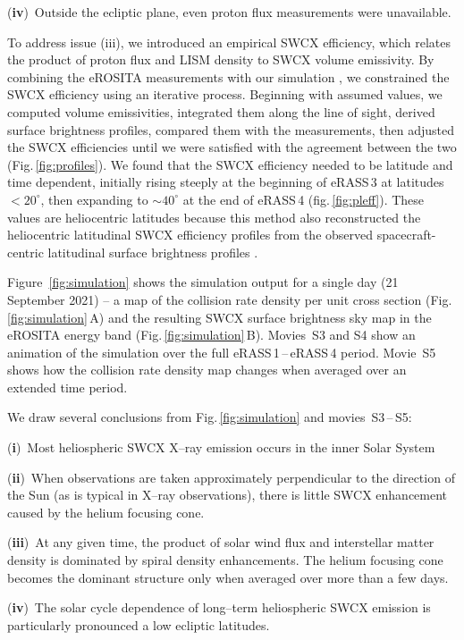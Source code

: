 \documentclass[12pt]{article}
\renewcommand{\deg}{^{\circ}}
\newcommand{\erass}{eRASS\,}
\begin{document}
({\bf iv})~Outside the ecliptic plane, even proton flux measurements were unavailable.

To address issue (iii), we introduced an empirical SWCX efficiency, which relates the product of proton flux and LISM density to SWCX volume emissivity. By combining the eROSITA measurements with our simulation \cite{methods}, we constrained the SWCX efficiency using an iterative process. Beginning with assumed values, we computed volume emissivities, integrated them along the line of sight, derived surface brightness profiles, compared them with the measurements, then adjusted the SWCX efficiencies until we were satisfied with the agreement between the two  (Fig.\,\ref{fig:profiles}). We found that the SWCX efficiency needed to be latitude and time dependent, initially rising steeply at the beginning of \erass3 at latitudes $<20\deg$, then expanding to $\sim40\deg$ at the end of \erass4 (fig.\,\ref{fig:pleff}). These values are heliocentric latitudes because this method also reconstructed  the heliocentric latitudinal SWCX efficiency profiles from the observed spacecraft-centric latitudinal surface brightness profiles \cite{methods}.

Figure~\ref{fig:simulation} shows the simulation output for a single day (21 September 2021) -- a map of the collision rate density per unit cross section (Fig.\,\ref{fig:simulation}\,A) and the resulting SWCX surface brightness sky map in the eROSITA energy band (Fig.\,\ref{fig:simulation}\,B).  Movies~S3 and S4 show an animation of the simulation over the full \erass1\,--\,\erass4 period. Movie~S5 shows how the collision rate density map changes when averaged over an extended time period.

We draw several conclusions from Fig.\,\ref{fig:simulation} and movies~S3\,--\,S5:

({\bf i})~Most heliospheric SWCX X--ray emission occurs in the inner Solar System \cite{note1}

({\bf ii})~When observations are taken approximately perpendicular to the direction of the Sun (as is typical in X--ray observations), there is little SWCX enhancement caused by the helium focusing cone.

({\bf iii})~At any given time, the product of solar wind flux and interstellar matter density is dominated by spiral density enhancements. The helium focusing cone becomes the dominant structure only when averaged over more than a few days.

({\bf iv})~The solar cycle dependence of long--term heliospheric SWCX emission is particularly pronounced a low ecliptic latitudes.
\end{document}
